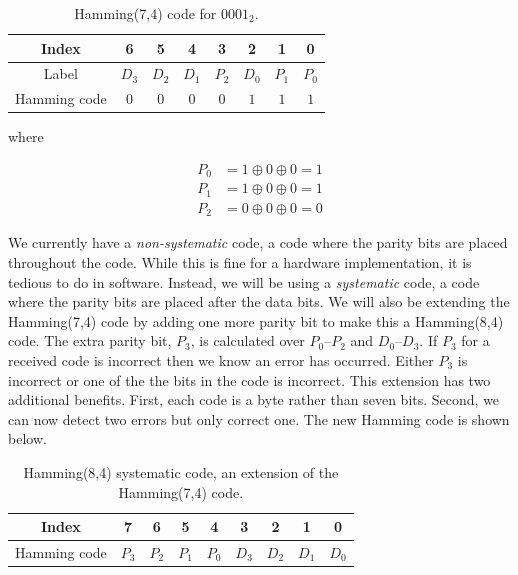 \documentclass[11pt]{article}
\begin{document}
\begin{table}[h]
    \centering
    \begin{tabular}{ |c|c|c|c|c|c|c|c| } 
        \hline
        Index & 6 & 5 & 4 & 3 & 2 & 1 & 0 \\
        \hline \hline
        Label & $D_3$ & $D_2$ & $D_1$ & $P_2$ & $D_0$ & $P_1$ & $P_0$ \\
        \hline
        Hamming code & $0$ & $0$ & $0$ & $0$ & $1$ & $1$ & $1$ \\
        \hline
    \end{tabular}
    \caption{Hamming(7,4) code for $0001_2$.}
    \label{ham7,4-ex}
\end{table}

\noindent where

\begin{equation*}
\begin{split}
    P_0 &= 1 \oplus 0 \oplus 0 = 1\\
    P_1 &= 1 \oplus 0 \oplus 0 = 1 \\
    P_2 &= 0 \oplus 0 \oplus 0 = 0
\end{split}
\end{equation*}

We currently have a \emph{non-systematic} code, a code where the parity bits are placed throughout the code.
While this is fine for a hardware implementation, it is tedious to do in software.
Instead, we will be using a \emph{systematic} code, a code where the parity bits are placed after the data bits. 
We will also be extending the Hamming(7,4) code by adding one more parity bit to make this a
Hamming(8,4) code. The extra parity bit, $P_3$, is calculated over $P_0$--$P_2$ and $D_0$--$D_3$. 
If $P_3$ for a received code is incorrect then we know an error has occurred. Either $P_3$ is incorrect
or one of the the bits in the code is incorrect.
This extension has two additional benefits. First, each code is a byte rather than seven bits. 
Second, we can now detect two errors but only correct one. The new Hamming code is shown below.

\begin{table}[h]
\centering
\begin{tabular}{ |c|c|c|c|c|c|c|c|c| } 
 \hline
 Index & 7 & 6 & 5 & 4 & 3 & 2 & 1 & 0 \\
 \hline \hline
 Hamming code & $P_3$ & $P_2$ & $P_1$ & $P_0$ & $D_3$ & $D_2$ & $D_1$ & $D_0$ \\
 \hline
\end{tabular}
\caption{Hamming(8,4) systematic code, an extension of the Hamming(7,4) code.}
\label{ham8,4}
\end{table}
\end{document}
